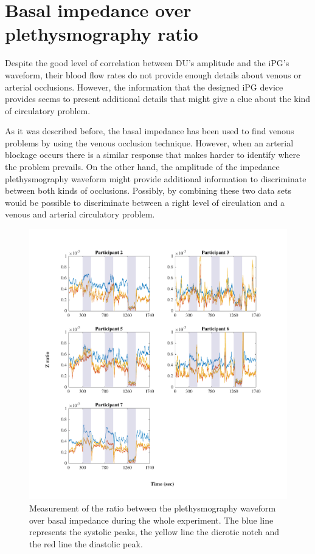 \section{Basal impedance over plethysmography ratio} %
\label{section discussion 2}

Despite the good level of correlation between DU's amplitude and the iPG's waveform, their blood flow rates do not provide enough details about venous or arterial occlusions. However, the information that the designed iPG device provides seems to present additional details that might give a clue about the kind of circulatory problem. 

As it was described before, the basal impedance has been used to find venous problems by using the venous occlusion technique. However, when an arterial blockage occurs there is a similar response that makes harder to identify where the problem prevails. On the other hand, the amplitude of the impedance plethysmography waveform might provide additional information to discriminate between both kinds of occlusions. Possibly, by combining these two data sets would be possible to discriminate between a right level of circulation and a venous and arterial circulatory problem. 

 \begin{figure}[!htpb]
 	\includegraphics[width=1\textwidth,keepaspectratio]{figure1}    
 	\caption[Comparison of the ratio of the plethysmography waveform over basal impedance during the whole experiment]{Measurement of the ratio between the plethysmography waveform over basal impedance during the whole experiment. The blue line represents the systolic peaks, the yellow line the dicrotic notch and the red line the diastolic peak.}
 	\label{fig:ratio Z}
 \end{figure}

